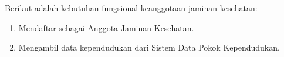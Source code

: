 Berikut adalah kebutuhan fungsional keanggotaan jaminan kesehatan:
\begin{enumerate}
	\item Mendaftar sebagai Anggota Jaminan Kesehatan.
	\item Mengambil data kependudukan dari Sistem Data Pokok Kependudukan.
\end{enumerate}